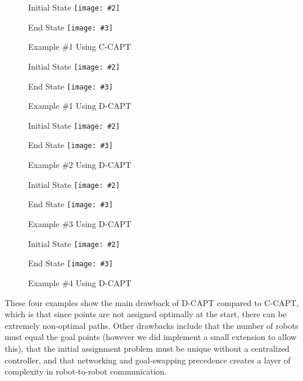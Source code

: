 \newcommand{\twofigure}[3]{
\begin{figure}[H]
\caption{#1}
\begin{minipage}[t]{0.45\linewidth}
\center
Initial State
\texttt{[image: \#2]}
\end{minipage}
\begin{minipage}[t]{0.45\linewidth}
\center
End State
\texttt{[image: \#3]}
\end{minipage}
\end{figure}
}

\twofigure{Example \#1 Using C-CAPT}{images/ccapt2d_cascade_start.png}{images/ccapt2d_cascade_goal.png}
\twofigure{Example \#1 Using D-CAPT}{images/dcapt2d_cascade_start.png}{images/dcapt2d_cascade_goal.png}
\twofigure{Example \#2 Using D-CAPT}{images/dcapt2d_circlebounce_start.png}{images/dcapt2d_circlebounce_goal.png}
\twofigure{Example \#3 Using D-CAPT}{images/dcapt2d_doublebounce_start.png}{images/dcapt2d_doublebounce_goal.png}
\twofigure{Example \#4 Using D-CAPT}{images/dcapt2d_pool_start.png}{images/dcapt2d_pool_goal.png}



These four examples show the main drawback of D-CAPT compared to C-CAPT, which is that since points are not assigned optimally at the start, there can be extremely non-optimal paths. Other drawbacks include that the number of robots must equal the goal points (however we did implement a small extension to allow this), that the initial assignment problem must be unique without a centralized controller, and that networking and goal-swapping precedence creates a layer of complexity in robot-to-robot communication.